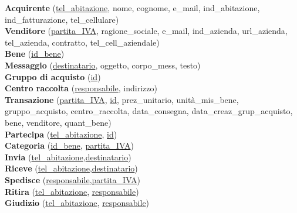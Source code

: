 \documentclass[a4paper, 10pt]{report}
\begin{document}
\bigskip
\textbf{Acquirente} (\underline{tel\_abitazione}, nome, cognome, e\_mail, ind\_abitazione, ind\_fatturazione, tel\_cellulare)\\
\textbf{Venditore} (\underline{partita\_IVA}, ragione\_sociale, e\_mail, ind\_azienda, url\_azienda, tel\_azienda, contratto, tel\_cell\_aziendale)\\
\textbf{Bene} (\underline{id\_bene})\\
\textbf{Messaggio} (\underline{destinatario}, oggetto, corpo\_mess, testo)\\
\textbf{Gruppo di acquisto} (\underline{id})\\
\textbf{Centro raccolta} (\underline{responsabile}, indirizzo)\\
\textbf{Transazione} (\underline{partita\_IVA}, \underline{id}, prez\_unitario, unit\`a\_mis\_bene, gruppo\_acquisto, centro\_raccolta, data\_consegna, data\_creaz\_grup\_acquisto, bene, venditore, quant\_bene)\\
\textbf{Partecipa} (\underline{tel\_abitazione}, \underline{id})\\
\textbf{Categoria} (\underline{id\_bene}, \underline{partita\_IVA})\\
\textbf{Invia} (\underline{tel\_abitazione},\underline{destinatario})\\
\textbf{Riceve} (\underline{tel\_abitazione},\underline{destinatario})\\
\textbf{Spedisce} (\underline{responsabile},\underline{partita\_IVA})\\
\textbf{Ritira} (\underline{tel\_abitazione}, \underline{responsabile})\\
\textbf{Giudizio} (\underline{tel\_abitazione}, \underline{responsabile})\\
\end{document}
